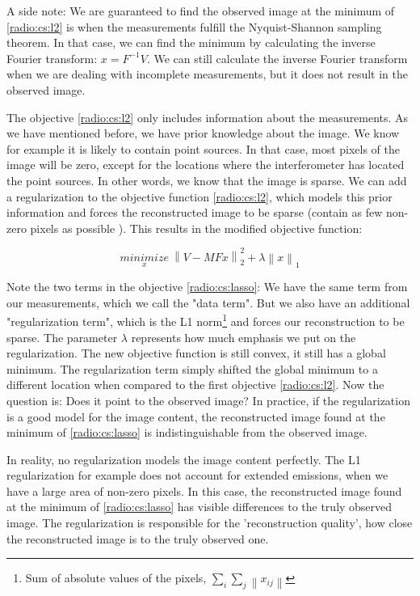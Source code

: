 A side note: We are guaranteed to find the observed image at the minimum of \eqref{radio:cs:l2} is when the measurements fulfill the Nyquist-Shannon sampling theorem. In that case, we can find the minimum by calculating the inverse Fourier transform: $x = F^{-1}V$. We can still calculate the inverse Fourier transform when we are dealing with incomplete measurements, but it does not result in the observed image.

The objective \eqref{radio:cs:l2} only includes information about the measurements. As we have mentioned before, we have prior knowledge about the image. We know for example it is likely to contain point sources. In that case, most pixels of the image will be zero, except for the locations where the interferometer has located the point sources. In other words, we know that the image is sparse. We can add a regularization to the objective function \eqref{radio:cs:l2}, which models this prior information and forces the reconstructed image to be sparse (contain as few non-zero pixels as possible ). This results in the modified objective function:

\begin{equation}\label{radio:cs:lasso}
\underset{x}{minimize} \: \left \| V - MFx \right \|_2^2 + \lambda \left \| x \right \|_1
\end{equation}

Note the two terms in the objective \eqref{radio:cs:lasso}: We have the same term from our measurements, which we call the "data term". But we also have an additional "regularization term", which is the L1 norm\footnote{Sum of absolute values of the pixels, $\sum_i \sum_j \left \| x_{ij} \right \|$} and forces our reconstruction to be sparse. The parameter $\lambda$ represents how much emphasis we put on the regularization. The new objective function is still convex, it still has a global minimum. The regularization term simply shifted the global minimum to a different location when compared to the first objective \eqref{radio:cs:l2}. Now the question is: Does it point to the observed image? In practice, if the regularization is a good model for the image content, the reconstructed image found at the minimum of \eqref{radio:cs:lasso} is indistinguishable from the observed image.

In reality, no regularization models the image content perfectly. The L1 regularization for example does not account for extended emissions, when we have a large area of non-zero pixels. In this case, the reconstructed image found at the minimum of \eqref{radio:cs:lasso} has visible differences to the truly observed image. The regularization is responsible for the 'reconstruction quality', how close the reconstructed image is to the truly observed one.

